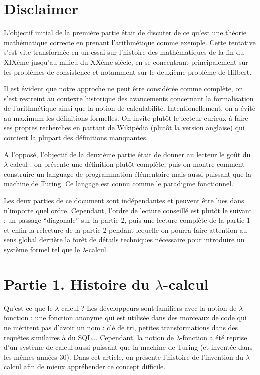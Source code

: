 \documentclass[12pt, a4paper]{article}
\begin{document}
	
\section*{Disclaimer}
L'objectif initial de la première partie était de discuter de ce qu'est une théorie mathématique correcte en prenant l'arithmétique comme exemple. Cette tentative s'est vite transformée en un essai sur l'histoire des mathématiques de la fin du XIXème jusqu'au milieu du XXème siècle, en se concentrant principalement sur les problèmes de consistence et notamment sur le deuxième problème de Hilbert.

Il est évident que notre approche ne peut être considérée comme complète, on s'est restreint au contexte historique des avancements concernant la formalisation de l'arithmétique ainsi que la notion de calculabilité. Intentionellement, on a évité au maximum les définitions formelles. On invite plutôt le lecteur curieux à faire ses propres recherches en partant de Wikipédia (plutôt la version anglaise) qui contient la plupart des définitions manquantes.

A l'opposé, l'objectif de la deuxième partie était de donner au lecteur le goût du $\lambda$-calcul : on présente une définition plutôt complète, puis on montre comment construire un language de programmation élémentaire mais aussi puissant que la machine de Turing. Ce langage est connu comme le paradigme fonctionnel.

Les deux parties de ce document sont indépendantes et peuvent être lues dans n'importe quel ordre.
Cependant, l'ordre de lecture conseillé est plutôt le suivant : un passage ``diagonale'' sur la partie 2, puis une lecture complète de la partie 1 et enfin la relecture de la partie 2 pendant lequelle on pourra faire attention au sens global derrière la forêt de détails techniques nécessaire pour introduire un système formel tel que le $\lambda$-calcul.
	
\section*{Partie 1. Histoire du $\lambda$-calcul}

Qu'est-ce que le $\lambda$-calcul ?
Les développeurs sont familiers avec la notion de $\lambda$-fonction : une fonction anonyme qui est utilisée dans des morceaux de code qui ne méritent pas d'avoir un nom : clé de tri, petites transformations dans des requêtes similaires à du SQL...
Cependant, la notion de $\lambda$-fonction a été reprise d'un système de calcul aussi puissant que la machine de Turing (et inventée dans les mêmes années 30).
Dans cet article, on présente l'histoire de l'invention du $\lambda$-calcul afin de mieux appréhender ce concept difficile.
\end{document}
